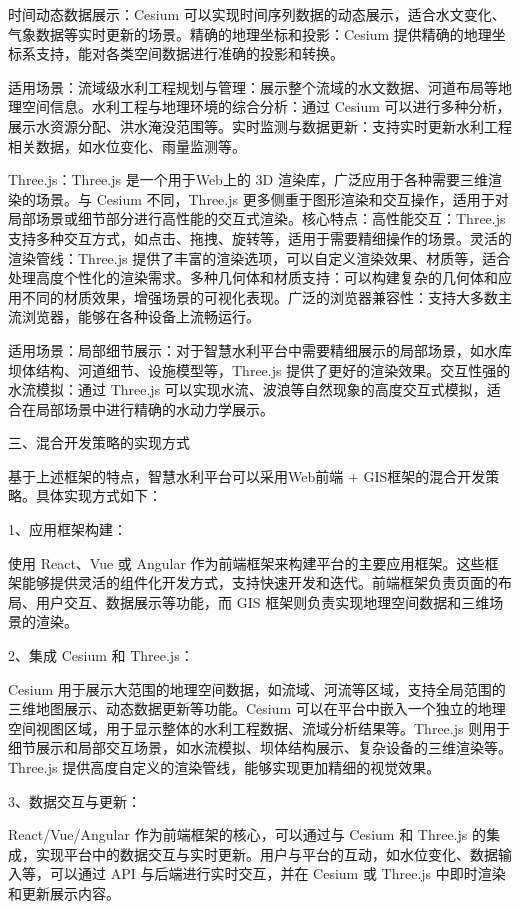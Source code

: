 时间动态数据展示：Cesium 可以实现时间序列数据的动态展示，适合水文变化、气象数据等实时更新的场景。精确的地理坐标和投影：Cesium 提供精确的地理坐标系支持，能对各类空间数据进行准确的投影和转换。

适用场景：流域级水利工程规划与管理：展示整个流域的水文数据、河道布局等地理空间信息。水利工程与地理环境的综合分析：通过 Cesium 可以进行多种分析，展示水资源分配、洪水淹没范围等。实时监测与数据更新：支持实时更新水利工程相关数据，如水位变化、雨量监测等。

Three.js：Three.js 是一个用于Web上的 3D 渲染库，广泛应用于各种需要三维渲染的场景。与 Cesium 不同，Three.js 更多侧重于图形渲染和交互操作，适用于对局部场景或细节部分进行高性能的交互式渲染。核心特点：高性能交互：Three.js 支持多种交互方式，如点击、拖拽、旋转等，适用于需要精细操作的场景。灵活的渲染管线：Three.js 提供了丰富的渲染选项，可以自定义渲染效果、材质等，适合处理高度个性化的渲染需求。多种几何体和材质支持：可以构建复杂的几何体和应用不同的材质效果，增强场景的可视化表现。广泛的浏览器兼容性：支持大多数主流浏览器，能够在各种设备上流畅运行。

适用场景：局部细节展示：对于智慧水利平台中需要精细展示的局部场景，如水库坝体结构、河道细节、设施模型等，Three.js 提供了更好的渲染效果。交互性强的水流模拟：通过 Three.js 可以实现水流、波浪等自然现象的高度交互式模拟，适合在局部场景中进行精确的水动力学展示。

三、混合开发策略的实现方式

基于上述框架的特点，智慧水利平台可以采用Web前端 + GIS框架的混合开发策略。具体实现方式如下：

1、应用框架构建：

使用 React、Vue 或 Angular 作为前端框架来构建平台的主要应用框架。这些框架能够提供灵活的组件化开发方式，支持快速开发和迭代。前端框架负责页面的布局、用户交互、数据展示等功能，而 GIS 框架则负责实现地理空间数据和三维场景的渲染。

2、集成 Cesium 和 Three.js：

Cesium 用于展示大范围的地理空间数据，如流域、河流等区域，支持全局范围的三维地图展示、动态数据更新等功能。Cesium 可以在平台中嵌入一个独立的地理空间视图区域，用于显示整体的水利工程数据、流域分析结果等。Three.js 则用于细节展示和局部交互场景，如水流模拟、坝体结构展示、复杂设备的三维渲染等。Three.js 提供高度自定义的渲染管线，能够实现更加精细的视觉效果。

3、数据交互与更新：

React/Vue/Angular 作为前端框架的核心，可以通过与 Cesium 和 Three.js 的集成，实现平台中的数据交互与实时更新。用户与平台的互动，如水位变化、数据输入等，可以通过 API 与后端进行实时交互，并在 Cesium 或 Three.js 中即时渲染和更新展示内容。


